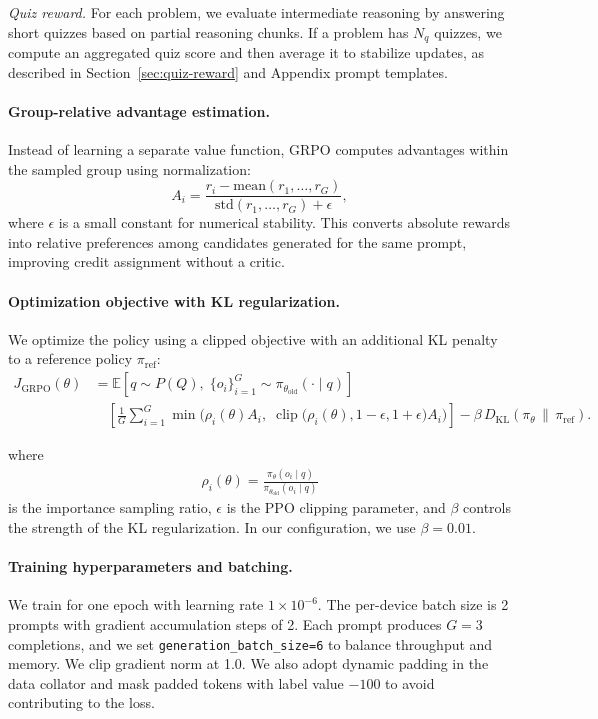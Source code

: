 \documentclass[12pt]{report}
\begin{document}
\emph{Quiz reward.}
For each problem, we evaluate intermediate reasoning by answering short quizzes
based on partial reasoning chunks. If a problem has \(N_q\) quizzes,
we compute an aggregated quiz score and then average it to stabilize updates,
as described in Section~\ref{sec:quiz-reward} and Appendix prompt templates.

\paragraph{Group-relative advantage estimation.}
Instead of learning a separate value function, GRPO computes advantages within
the sampled group using normalization:
\[
A_i=\frac{r_i-\mathrm{mean}(r_1,\dots,r_G)}{\mathrm{std}(r_1,\dots,r_G)+\epsilon},
\]
where \(\epsilon\) is a small constant for numerical stability.
This converts absolute rewards into relative preferences among candidates
generated for the same prompt, improving credit assignment without a critic.

\paragraph{Optimization objective with KL regularization.}
We optimize the policy using a clipped objective with an additional KL penalty
to a reference policy $\pi_{\mathrm{ref}}$:
\begin{align}
J_{\text{GRPO}}(\theta)
&= \mathbb{E}\!\left[
q \sim P(Q),\;
\{o_i\}_{i=1}^{G} \sim \pi_{\theta_{\text{old}}}(\cdot \mid q)
\right] \nonumber \\
&\quad \left[
\frac{1}{G} \sum_{i=1}^{G}
\min\Big(
\rho_i(\theta) A_i,\;
\operatorname{clip}\big(\rho_i(\theta), 1-\epsilon, 1+\epsilon\big) A_i
\Big)
\right]
- \beta\, D_{\mathrm{KL}}\!\left(
\pi_\theta \,\|\, \pi_{\text{ref}}
\right).
\end{align}

where 
\begin{align}
\rho_i(\theta) = 
\frac{\pi_\theta(o_i \mid q)}
     {\pi_{\theta_{\text{old}}}(o_i \mid q)}
\end{align} 
is the importance sampling ratio, $\epsilon$ is the PPO clipping parameter,
and $\beta$ controls the strength of the KL regularization.
In our configuration, we use \(\beta=0.01\).

\paragraph{Training hyperparameters and batching.}
We train for one epoch with learning rate \(1\times 10^{-6}\).
The per-device batch size is 2 prompts with gradient accumulation steps of 2.
Each prompt produces \(G=3\) completions, and we set
\texttt{generation\_batch\_size=6} to balance throughput and memory.
We clip gradient norm at 1.0.
We also adopt dynamic padding in the data collator and mask padded tokens with
label value \(-100\) to avoid contributing to the loss.
\end{document}
